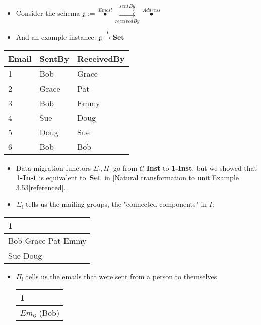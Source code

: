 
\begin{itemize}
    \item  Consider the schema $\mathfrak{g} := \boxed{\overset{Email}\bullet \overset{sentBy}{\underset{receivedBy}{\rightrightarrows}} \overset{Address}\bullet}$
    \item And an example instance: $\mathfrak{g}\xrightarrow{I}\mathbf{Set}$
  \end{itemize}

  \begin{minipage}{0.48\textwidth}
    \begin{tabular}{|l|l|l|}
      \hline
      Email & SentBy & ReceivedBy \\ \hline
      1     & Bob    & Grace      \\ \hline
      2     & Grace  & Pat        \\ \hline
      3     & Bob    & Emmy       \\ \hline
      4     & Sue    & Doug       \\ \hline
      5     & Doug   & Sue        \\ \hline
      6     & Bob    & Bob        \\ \hline
    \end{tabular}
  \end{minipage}

  \begin{itemize}
    \item Data migration functors $\Sigma_!,\Pi_!$ go from $\mathcal{C}$ \textbf{Inst} to \textbf{1-Inst}, but we showed that \textbf{1-Inst} is equivalent to \,\textbf{Set}\, in \ref{Natural transformation to unit|Example 3.53|referenced}.
    \item $\Sigma_!$ tells us the mailing groups, the "connected components" in $I$:
  \end{itemize}

  \begin{minipage}{0.48\textwidth}
    \begin{tabular}{|l|}
      \hline
      1                  \\ \hline
      Bob-Grace-Pat-Emmy \\ \hline
      Sue-Doug           \\ \hline
    \end{tabular}
  \end{minipage}

  \begin{itemize}
    \item $\Pi_!$ tells us the emails that were sent from a person to themselves

          \begin{minipage}{0.48\textwidth}
            \begin{tabular}{|l|}
              \hline
              1            \\ \hline
              $Em_6$ (Bob) \\ \hline
            \end{tabular}
          \end{minipage}

  \end{itemize}